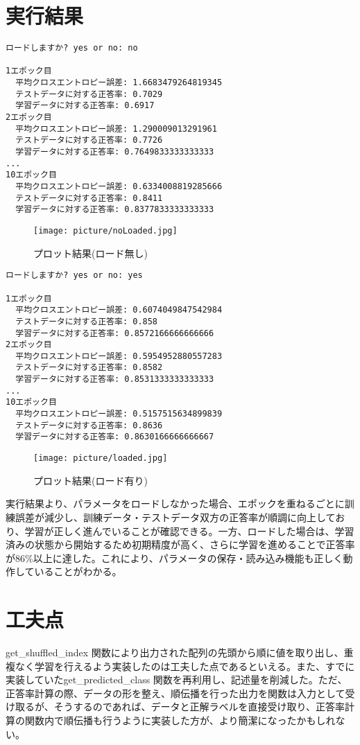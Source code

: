 \documentclass[11px,a4,dvipdfmx]{jsarticle}
\begin{document}
\section{実行結果}
\begin{verbatim}
ロードしますか? yes or no: no

1エポック目
  平均クロスエントロピー誤差: 1.6683479264819345
  テストデータに対する正答率: 0.7029
  学習データに対する正答率: 0.6917
2エポック目
  平均クロスエントロピー誤差: 1.290009013291961
  テストデータに対する正答率: 0.7726
  学習データに対する正答率: 0.7649833333333333
...
10エポック目
  平均クロスエントロピー誤差: 0.6334008819285666
  テストデータに対する正答率: 0.8411
  学習データに対する正答率: 0.8377833333333333
\end{verbatim}
 \begin{figure}[H]
		      \begin{center}
			      \texttt{[image: picture/noLoaded.jpg]}
			      \caption{プロット結果(ロード無し)}
		      \end{center}
\end{figure}
\begin{verbatim}
ロードしますか? yes or no: yes

1エポック目
  平均クロスエントロピー誤差: 0.6074049847542984
  テストデータに対する正答率: 0.858
  学習データに対する正答率: 0.8572166666666666
2エポック目
  平均クロスエントロピー誤差: 0.5954952880557283
  テストデータに対する正答率: 0.8582
  学習データに対する正答率: 0.8531333333333333
...
10エポック目
  平均クロスエントロピー誤差: 0.5157515634899839
  テストデータに対する正答率: 0.8636
  学習データに対する正答率: 0.8630166666666667
\end{verbatim}
\begin{figure}[H]
		      \begin{center}
			      \texttt{[image: picture/loaded.jpg]}
			      \caption{プロット結果(ロード有り)}
		      \end{center}
\end{figure}
実行結果より、パラメータをロードしなかった場合、エポックを重ねるごとに訓練誤差が減少し、訓練データ・テストデータ双方の正答率が順調に向上しており、学習が正しく進んでいることが確認できる。一方、ロードした場合は、学習済みの状態から開始するため初期精度が高く、さらに学習を進めることで正答率が86\%以上に達した。これにより、パラメータの保存・読み込み機能も正しく動作していることがわかる。


\section{工夫点}
get\_shuffled\_index 関数により出力された配列の先頭から順に値を取り出し、重複なく学習を行えるよう実装したのは工夫した点であるといえる。また、すでに実装していたget\_predicted\_class 関数を再利用し、記述量を削減した。ただ、正答率計算の際、データの形を整え、順伝播を行った出力を関数は入力として受け取るが、そうするのであれば、データと正解ラベルを直接受け取り、正答率計算の関数内で順伝播も行うように実装した方が、より簡潔になったかもしれない。
\end{document}
